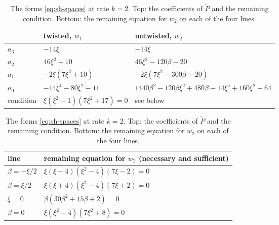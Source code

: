 \documentclass[11pt]{article}
\theoremstyle{definition}
\theoremstyle{remark}
\numberwithin{equation}{section}
\begin{document}
\begin{table}[ht]
\centering
\small
\begin{tabular}{@{}lll@{}}
\toprule
 & twisted, \(w_1\) & untwisted, \(w_2\)\\
\midrule
\(a_3\) & \(-14\xi\) & \(-14\xi\)\\
\(a_2\) & \(46\xi^2+10\) & \(46\xi^2-120\beta-20\)\\
\(a_1\) & \(-2\xi(7\xi^2+10)\) & \(-2\xi(7\xi^2-300\beta-20)\)\\
\(a_0\) & \(-14\xi^4-80\xi^2-11\) &
 \(1440\beta^2-120\beta\xi^2+480\beta-14\xi^4+160\xi^2+64\)\\
condition & \(\xi(\xi^2-1)(7\xi^2+17)=0\) & see below\\
\bottomrule
\end{tabular}

\medskip
\begin{tabular}{@{}ll@{}}
\toprule
line & remaining equation for \(w_2\) (necessary and sufficient)\\
\midrule
\(\beta=-\xi/2\) & \(\xi(\xi-4)(\xi^2-4)(7\xi-2)=0\)\\
\(\beta=\xi/2\) & \(\xi(\xi+4)(\xi^2-4)(7\xi+2)=0\)\\
\(\xi=0\) & \(\beta(30\beta^2+15\beta+2)=0\)\\
\(\beta=0\) & \(\xi(\xi^2-4)(7\xi^2+8)=0\)\\
\bottomrule
\end{tabular}
\caption{The forms \eqref{eq:sh-spaces} at rate \(k=2\). Top: the
coefficients of \(\widetilde P\) and the remaining condition. Bottom:
the remaining equation for \(w_2\) on each of the four lines.}
\label{tab:sh}
\end{table}
\end{document}
